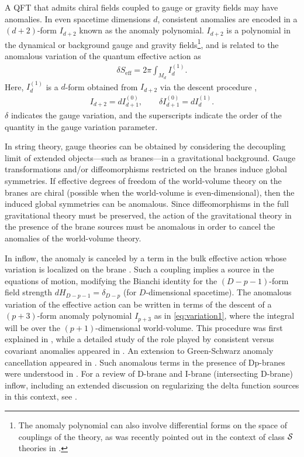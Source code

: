 \documentclass[a4paper,11pt]{article}
\newcommand{\ba}[1]{\begin{align} #1 \end{align} }
\def\CS{{\cal S}}
\begin{document}
A QFT that admits chiral fields coupled to gauge or gravity fields may have anomalies. In even spacetime dimensions $d$, consistent anomalies are encoded in a $(d+2)$-form $I_{d+2}$ known as the anomaly polynomial. $I_{d+2}$ is a polynomial in the dynamical or background gauge and gravity fields\footnote{The anomaly polynomial can also involve differential forms on the space of couplings of the theory, as was recently pointed out in the context of class $\CS$ theories in \cite{Tachikawa:2017aux}.}, and is related to the anomalous variation of the quantum effective action as
	\ba{
	\delta {S}_{\text{eff}} = 2\pi \int_{M_d} I_{d}^{(1)}. \label{eq:variation1}
	}
Here, $I_{d}^{(1)}$ is a $d$-form obtained from $I_{d+2}$ via the descent procedure \cite{AlvarezGaume:1983ig,AlvarezGaume:1984dr,Bardeen:1984pm},
	\ba{
	I_{d+2}=dI_{d+1}^{(0)},\qquad \delta I_{d+1}^{(0)} = dI_{d}^{(1)}.
	}
$\delta$ indicates the gauge variation, and the superscripts indicate the order of the quantity in the gauge variation parameter.


In string theory, gauge theories can be obtained by considering the decoupling limit of extended objects---such as branes---in a gravitational background. Gauge transformations and/or diffeomorphisms restricted on the branes induce global symmetries. If effective degrees of freedom of the world-volume theory on the branes are chiral (possible when the world-volume is even-dimensional), then the induced global symmetries can be anomalous.  Since diffeomorphisms in the full gravitational theory must be preserved, the action of the gravitational theory in the presence of the brane sources must be anomalous in order to cancel the anomalies of the world-volume theory. 

In inflow, the anomaly is canceled by a term in the bulk effective action whose variation is localized on the brane \cite{Faddeev:1985iz,Callan:1984sa}. Such a coupling implies a source in the equations of motion, modifying the Bianchi identity for the $(D-p-1)$-form field strength $d H_{D-p-1} = \delta_{D-p}$ (for $D$-dimensional spacetime). The anomalous variation of the effective action can be written in terms of the descent of a $(p+3)$-form anomaly polynomial $I_{p+3}$ as in \eqref{eq:variation1}, where the integral will be over the $(p+1)$-dimensional world-volume. This procedure was first explained in \cite{Callan:1984sa}, while a detailed study of the role played by consistent versus covariant anomalies appeared in \cite{Naculich:1987ci}. An extension to Green-Schwarz anomaly cancellation appeared in \cite{Blum:1993yd}.  Such anomalous terms in the presence of Dp-branes were understood in \cite{Green:1996dd,Cheung:1997az,Minasian:1997mm}. For a review of D-brane and I-brane (intersecting D-brane) inflow, including an extended discussion on regularizing the delta function sources in this context, see \cite{Kim:2012wc}.
\end{document}
